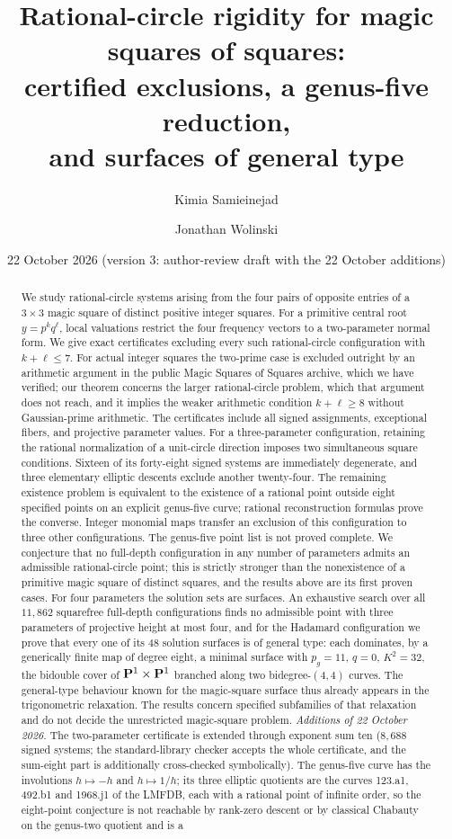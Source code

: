 \documentclass[11pt,letterpaper]{article}
\title{Rational-circle rigidity for magic squares of squares:\\certified exclusions, a genus-five reduction,\\and surfaces of general type}
\author{Kimia Samieinejad \and Jonathan Wolinski}
\date{22 October 2026 (version 3: author-review draft with the 22 October additions)}
\theoremstyle{definition}\newtheorem{definition}[theorem]{Definition}
\theoremstyle{remark}\newtheorem{remark}[theorem]{Remark}
\begin{document}
\maketitle
\begin{abstract}
We study rational-circle systems arising from the four pairs of opposite entries of a $3\times3$ magic square of distinct positive integer squares. For a primitive central root $y=p^kq^\ell$, local valuations restrict the four frequency vectors to a two-parameter normal form. We give exact certificates excluding every such rational-circle configuration with $k+\ell\le7$. For actual integer squares the two-prime case is excluded outright by an arithmetic argument in the public Magic Squares of Squares archive, which we have verified; our theorem concerns the larger rational-circle problem, which that argument does not reach, and it implies the weaker arithmetic condition $k+\ell\ge8$ without Gaussian-prime arithmetic. The certificates include all signed assignments, exceptional fibers, and projective parameter values. For a three-parameter configuration, retaining the rational normalization of a unit-circle direction imposes two simultaneous square conditions. Sixteen of its forty-eight signed systems are immediately degenerate, and three elementary elliptic descents exclude another twenty-four. The remaining existence problem is equivalent to the existence of a rational point outside eight specified points on an explicit genus-five curve; rational reconstruction formulas prove the converse. Integer monomial maps transfer an exclusion of this configuration to three other configurations. The genus-five point list is not proved complete. We conjecture that no full-depth configuration in any number of parameters admits an admissible rational-circle point; this is strictly stronger than the nonexistence of a primitive magic square of distinct squares, and the results above are its first proven cases. For four parameters the solution sets are surfaces. An exhaustive search over all $11{,}862$ squarefree full-depth configurations finds no admissible point with three parameters of projective height at most four, and for the Hadamard configuration we prove that every one of its $48$ solution surfaces is of general type: each dominates, by a generically finite map of degree eight, a minimal surface with $p_g=11$, $q=0$, $K^2=32$, the bidouble cover of $\mathbf P^1\times\mathbf P^1$ branched along two bidegree-$(4,4)$ curves. The general-type behaviour known for the magic-square surface thus already appears in the trigonometric relaxation. The results concern specified subfamilies of that relaxation and do not decide the unrestricted magic-square problem. \emph{Additions of 22 October 2026.} The two-parameter certificate is extended through exponent sum ten ($8{,}688$ signed systems; the standard-library checker accepts the whole certificate, and the sum-eight part is additionally cross-checked symbolically). The genus-five curve has the involutions $h\mapsto-h$ and $h\mapsto1/h$; its three elliptic quotients are the curves 123.a1, 492.b1 and 1968.j1 of the LMFDB, each with a rational point of infinite order, so the eight-point conjecture is not reachable by rank-zero descent or by classical Chabauty on the genus-two quotient and is a 
\end{abstract}
\end{document}
